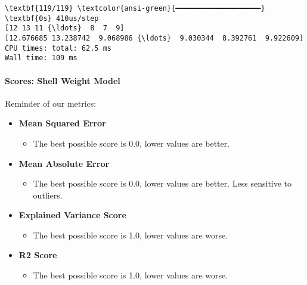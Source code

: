 \documentclass[11pt]{article}
\providecommand{\tightlist}{%
      \setlength{\itemsep}{0pt}\setlength{\parskip}{0pt}}
\begin{document}
    \begin{Verbatim}[commandchars=\\\{\}]
\textbf{119/119} \textcolor{ansi-green}{━━━━━━━━━━━━━━━━━━━━} \textbf{0s} 410us/step
[12 13 11 {\ldots}  8  7  9]
[12.676685 13.238742  9.068986 {\ldots}  9.030344  8.392761  9.922609]
CPU times: total: 62.5 ms
Wall time: 109 ms
    \end{Verbatim}

    \paragraph{Scores: Shell Weight Model}\label{scores-shell-weight-model}

Reminder of our metrics:

\begin{itemize}
\tightlist
\item
  \textbf{Mean Squared Error}

  \begin{itemize}
  \tightlist
  \item
    The best possible score is 0.0, lower values are better.
  \end{itemize}
\item
  \textbf{Mean Absolute Error}

  \begin{itemize}
  \tightlist
  \item
    The best possible score is 0.0, lower values are better. Less
    sensitive to outliers.
  \end{itemize}
\item
  \textbf{Explained Variance Score}

  \begin{itemize}
  \tightlist
  \item
    The best possible score is 1.0, lower values are worse.
  \end{itemize}
\item
  \textbf{R2 Score}

  \begin{itemize}
  \tightlist
  \item
    The best possible score is 1.0, lower values are worse.
  \end{itemize}
\end{itemize}
\end{document}
